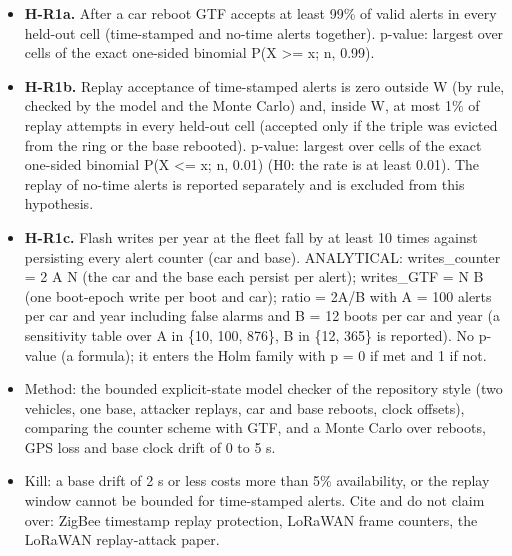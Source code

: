 \begin{itemize}
\item \textbf{H-R1a.} After a car reboot GTF accepts at least 99\% of valid alerts in every held-out cell (time-stamped and no-time alerts together). p-value: largest over cells of the exact one-sided binomial P(X >= x; n, 0.99).
\item \textbf{H-R1b.} Replay acceptance of time-stamped alerts is zero outside W (by rule, checked by the model and the Monte Carlo) and, inside W, at most 1\% of replay attempts in every held-out cell (accepted only if the triple was evicted from the ring or the base rebooted). p-value: largest over cells of the exact one-sided binomial P(X <= x; n, 0.01) (H0: the rate is at least 0.01). The replay of no-time alerts is reported separately and is excluded from this hypothesis.
\item \textbf{H-R1c.} Flash writes per year at the fleet fall by at least 10 times against persisting every alert counter (car and base). ANALYTICAL: writes\_counter = 2 A N (the car and the base each persist per alert); writes\_GTF = N B (one boot-epoch write per boot and car); ratio = 2A/B with A = 100 alerts per car and year including false alarms and B = 12 boots per car and year (a sensitivity table over A in \{10, 100, 876\}, B in \{12, 365\} is reported). No p-value (a formula); it enters the Holm family with p = 0 if met and 1 if not.
\item Method: the bounded explicit-state model checker of the repository style (two vehicles, one base, attacker replays, car and base reboots, clock offsets), comparing the counter scheme with GTF, and a Monte Carlo over reboots, GPS loss and base clock drift of 0 to 5 s.
\item Kill: a base drift of 2 s or less costs more than 5\% availability, or the replay window cannot be bounded for time-stamped alerts. Cite and do not claim over: ZigBee timestamp replay protection, LoRaWAN frame counters, the LoRaWAN replay-attack paper.
\end{itemize}

